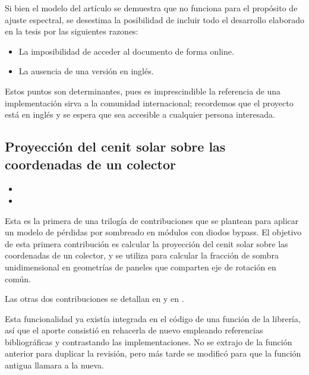 Si bien el modelo del artículo \cite{Martín_Ruiz_1999} se demuestra que no funciona para el propósito de ajuste espectral, se desestima la posibilidad de incluir todo el desarrollo elaborado en la tesis \cite{Martín_Chivelet_1999} por las siguientes razones:

\begin{itemize}
    \item La imposibilidad de acceder al documento de forma online.
    \item La ausencia de una versión en inglés.
\end{itemize}

Estos puntos son determinantes, pues es imprescindible la referencia de una implementación sirva a la comunidad internacional; recordemos que el proyecto \pvlibpy{} está en inglés y se espera que sea accesible a cualquier persona interesada.

\subsection{Proyección del cenit solar sobre las coordenadas de un colector} \label{sct:desarrollo:contribuciones_cientificas:proyeccion_cenit}

\begin{itemize}
    \item {}
    \item {}
\end{itemize}

Esta es la primera de una trilogía de contribuciones que se plantean para aplicar un modelo de pérdidas por sombreado en módulos con diodos bypass. El objetivo de esta primera contribución es calcular la proyección del cenit solar sobre las coordenadas de un colector, y se utiliza para calcular la fracción de sombra unidimensional en geometrías de paneles que comparten eje de rotación en común.

Las otras dos contribuciones se detallan en  y en .

Esta funcionalidad ya existía integrada en el código de una función de la librería, así que el aporte consistió en rehacerla de nuevo empleando referencias bibliográficas y contrastando las implementaciones. No se extrajo de la función anterior para duplicar la revisión, pero más tarde se modificó para que la función antigua llamara a la nueva.

